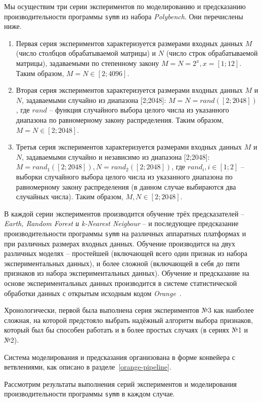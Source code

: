 Мы осуществим три серии экспериментов по моделированию и предсказанию производительности программы \texttt{symm} из набора \textit{Polybench}. Они перечислены ниже.
\begin{enumerate}
    \item Первая серия экспериментов характеризуется размерами входных данных $M$ (число столбцов обрабатываемой матрицы) и $N$ (число строк обрабатываемой матрицы), задаваемыми по степенному закону $M = N = 2^x, x = [1;12]$. Таким образом, $M = N \in [2;4096]$.
    \item Вторая серия экспериментов характеризуется размерами входных данных $M$ и $N$, задаваемыми случайно из диапазона [2;2048]: $M = N = rand([2;2048])$, где $rand$ -- функция случайного выбора целого числа из указанного диапазона по равномерному закону распределения. Таким образом, $M = N \in [2;2048]$.
    \item Третья серия экспериментов характеризуется размерами входных данных $M$ и $N$, задаваемыми случайно и независимо из диапазона [2;2048]: $M = rand_1([2;2048]), N = rand_2([2;2048])$, где $rand_i, i \in [1;2]$ -- выборки случайного выбора целого числа из указанного диапазона по равномерному закону распределения (в данном случае выбираются два случайных числа). Таким образом, $M, N \in [2;2048]$.
\end{enumerate}

В каждой серии экспериментов производится обучение трёх предсказателей -- \textit{Earth, Random Forest и k-Nearest Neigbour} -- и последующее предсказание производительности программы \texttt{symm} на различных аппаратных платформах и при различных размерах входных данных. Обучение производится на двух различных моделях -- простейшей (включающей всего один признак из набора экспериментальных данных), и более сложной (включающей в себя до пяти признаков из набора экспериментальных данных). Обучение и предсказание на основе экспериментальных данных производится в системе статистической обработки данных с открытым исходным кодом \textit{Orange}~\cite{orange}.

Хронологически, первой была выполнена серия экспериментов №3 как наиболее сложная, на которой предстояло выбрать надёжный алгоритм выбора признаков, который был бы способен работать и в более простых случаях (в сериях №1 и №2).

Система моделирования и предсказания организована в форме конвейера с ветвлениями, как описано в разделе~\ref{orange-pipeline}.

Рассмотрим результаты выполнения серий экспериментов и моделирования производительности программы \texttt{symm} в каждом случае.


